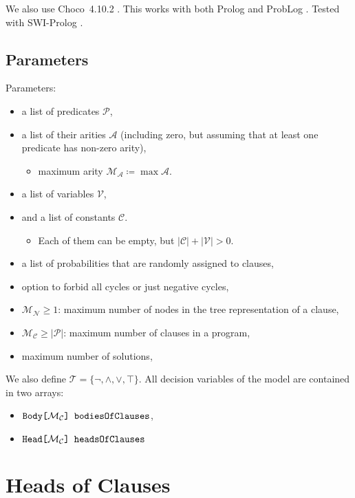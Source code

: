 \documentclass[runningheads]{llncs}
\newcommand{\variable}[1]{\texttt{\textup{#1}}}
\newcommand{\arrayt}[3]{\variable{{#3}[}{#2}\variable{] {#1}}}
\newcommand{\predicates}{\mathcal{P}}
\newcommand{\variables}{\mathcal{V}}
\newcommand{\constants}{\mathcal{C}}
\newcommand{\tokens}{\mathcal{T}}
\newcommand{\arities}{\mathcal{A}}
\newcommand{\maxArity}{\mathcal{M}_{\mathcal{A}}}
\newcommand{\maxNumNodes}{\mathcal{M}_{\mathcal{N}}}
\newcommand{\maxNumClauses}{\mathcal{M}_{\mathcal{C}}}
\begin{document}
We also use Choco~4.10.2 \cite{choco}. This works with both Prolog
\cite{DBLP:books/daglib/0041598} and ProbLog \cite{DBLP:conf/ijcai/RaedtKT07}.
Tested with SWI-Prolog \cite{DBLP:journals/tplp/WielemakerSTL12}.

\subsection{Parameters}

Parameters:
\begin{itemize}
\item a list of predicates $\predicates{}$,
\item a list of their arities $\arities{}$ (including zero, but assuming that at
  least one predicate has non-zero arity),
  \begin{itemize}
  \item maximum arity $\maxArity{} \coloneqq \max \arities{}$.
  \end{itemize}
\item a list of variables $\variables{}$,
\item and a list of constants $\constants{}$.
  \begin{itemize}
  \item Each of them can be empty, but $|\constants{}| + |\variables{}| > 0$.
  \end{itemize}
\item a list of probabilities that are randomly assigned to clauses,
\item option to forbid all cycles or just negative cycles,
\item $\maxNumNodes{} \ge 1$: maximum number of nodes in the tree representation
  of a clause,
\item $\maxNumClauses{} \ge |\predicates{}|$: maximum number of clauses in a
  program,
\item maximum number of solutions,
\end{itemize}

We also define $\tokens{} = \{ \neg, \land, \lor, \top \}$. All decision
variables of the model are contained in two arrays:
\begin{itemize}
\item $\arrayt{bodiesOfClauses}{\maxNumClauses{}}{Body}$,
\item $\arrayt{headsOfClauses}{\maxNumClauses{}}{Head}$
\end{itemize}

\section{Heads of Clauses}
\end{document}
